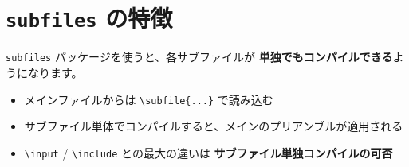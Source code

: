 \documentclass[../104_Subfiles.tex]{subfiles}
\begin{document}
\section{\texttt{subfiles} の特徴}

\texttt{subfiles} パッケージを使うと、各サブファイルが
\textbf{単独でもコンパイルできる}ようになります。

\begin{itemize}
  \item メインファイルからは \texttt{\textbackslash subfile\{...\}} で読み込む
  \item サブファイル単体でコンパイルすると、メインのプリアンブルが適用される
  \item \texttt{\textbackslash input} / \texttt{\textbackslash include} との最大の違いは
        \textbf{サブファイル単独コンパイルの可否}
\end{itemize}
\end{document}
